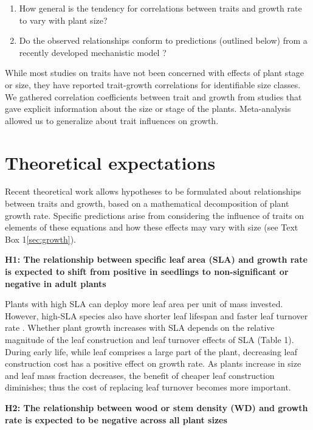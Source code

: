 \documentclass[a4paper]{article}\usepackage[]{graphicx}\usepackage[]{color}
\begin{document}
\begin{enumerate}
  \item How general is the tendency for correlations between traits and growth rate to vary with plant size?
  \item Do the observed relationships conform to predictions (outlined below) from a recently developed  mechanistic
model \citep{Falster:2011ii, falster:2013}?
\end{enumerate}

While most studies on traits have not been concerned with effects of plant stage or size, they have reported trait-growth correlations for identifiable size classes. We gathered correlation coefficients between trait and growth from studies that gave explicit information about the size or stage of the plants. Meta-analysis allowed us to generalize about trait influences on growth. 

\section*{Theoretical expectations}\label{theory}

Recent theoretical work \citep{Falster:2011ii} allows hypotheses to be formulated about relationships between traits and growth, based on a mathematical decomposition of plant growth rate. Specific predictions arise from considering the influence of traits on elements of these equations and how these effects may vary with size (see Text Box 1\ref{sec:growth}).

\textbf{H1: The relationship between specific leaf area (SLA) and growth rate is expected to shift from positive in seedlings to non-significant or negative in adult plants}

Plants with high SLA can deploy more leaf area per unit of mass invested. However, high-SLA species also have shorter leaf lifespan and faster leaf turnover rate \citep{Wright:2004jb}. Whether plant growth increases with SLA depends on the relative magnitude of the leaf construction and leaf turnover effects of SLA (Table 1). During early life, while leaf comprises a large part of the plant, decreasing leaf construction cost has a positive effect on growth rate. As plants increase in size and leaf mass fraction decreases, the benefit of cheaper leaf construction diminishes; thus the cost of replacing leaf turnover becomes more important. 


\textbf{H2: The relationship between wood or stem density (WD) and growth rate is expected to be negative across all plant sizes}
\end{document}
